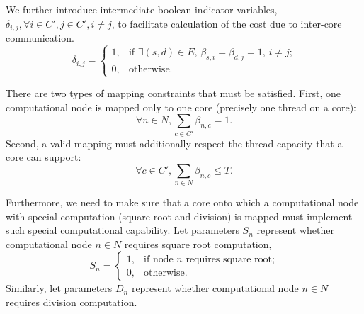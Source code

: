 We further introduce intermediate boolean indicator variables,  $\delta_{i,j}, \forall i \in C',j \in C', i \ne j$, to facilitate calculation of the cost due to inter-core communication. 
%
\begin{equation} \label{eq:intermediate_var_inter_core_comm}
\delta_{i,j}=
\begin{cases}
1, &\text{if $\exists (s, d) \in E$, $\beta_{s,i} = \beta_{d,j} = 1$, $i \ne j$;}\\
0, &\text{otherwise.}
\end{cases}
\end{equation}

There are two types of mapping constraints that must be satisfied. First, one computational node is mapped only to one core (precisely one thread on a core):
%
\begin{equation} \label{eq:constraint_map1}
\forall n \in N, \sum_{c \in C'} \beta_{n,c} = 1.
\end{equation}
%
Second, a valid mapping must additionally respect the thread capacity that a core can support:
%
\begin{equation} \label{eq:constraint_map2}
\forall c \in C', \sum_{n \in N} \beta_{n,c} \le T.
\end{equation}

Furthermore, we need to make sure that a core onto which a computational node with special computation (square root and division) is mapped must implement such special computational capability. Let parameters $S_n$ represent whether computational node $n \in N$ requires square root computation,
%
\begin{equation*}%
S_{n}=
\begin{cases}
1, &\text{if node $n$ requires square root;}\\
0, &\text{otherwise.}
\end{cases}
\end{equation*}
%
Similarly, let parameters $D_n$ represent whether computational node $n \in N$ requires division computation.
%

